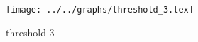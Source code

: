 \begin{figure}[h] \centering\texttt{[image: ../../graphs/threshold\_3.tex]}\caption{threshold 3}\label{gr:threshold_3} \end{figure}

